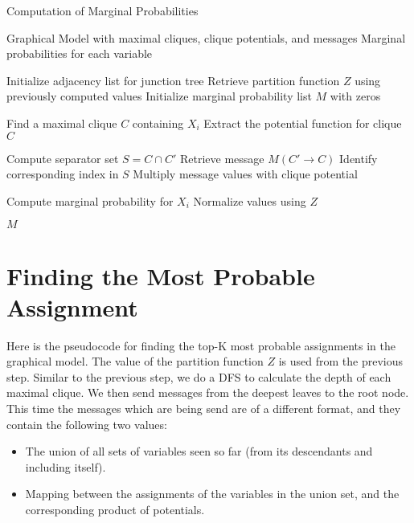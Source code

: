 \documentclass[a4paper,12pt]{article}
\begin{document}
\begin{algorithm}
    \caption{Computation of Marginal Probabilities}
    \begin{algorithmic}[1]
    \Require Graphical Model with maximal cliques, clique potentials, and messages
    \Ensure Marginal probabilities for each variable

    \State Initialize adjacency list for junction tree
    \State Retrieve partition function $Z$ using previously computed values
    \State Initialize marginal probability list $M$ with zeros

        \State Find a maximal clique $C$ containing $X_i$
        \State Extract the potential function for clique $C$

            \State Compute separator set $S = C \cap C'$
            \State Retrieve message $M(C' \to C)$
                \State Identify corresponding index in $S$
                \State Multiply message values with clique potential
            \EndFor
        \EndFor

        \State Compute marginal probability for $X_i$
        \State Normalize values using $Z$
    \EndFor

    \State \Return $M$
    \end{algorithmic}
\end{algorithm}




\section{Finding the Most Probable Assignment}
Here is the pseudocode for finding the top-K most probable assignments in the graphical model. The value of the partition function \( Z \) is used from the previous step. Similar to the previous step, we do a DFS to calculate the depth of each maximal clique. We then send messages from the deepest leaves to the root node. This time the messages which are being send are of a different format, and they contain the following two values:
\begin{itemize}
    \item The union of all sets of variables seen so far (from its descendants and including itself).
    \item Mapping between the assignments of the variables in the union set, and the corresponding product of potentials.
\end{itemize}
\end{document}
